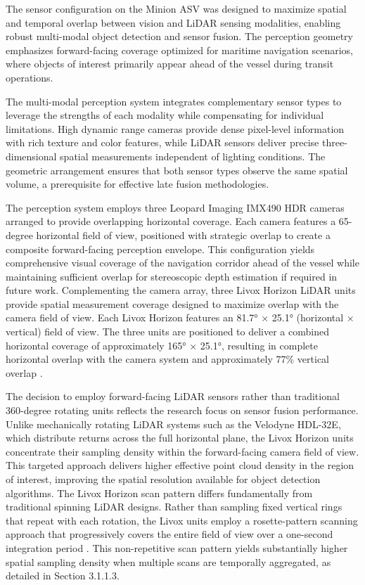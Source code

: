\documentclass{erauthesis}
\begin{document}
The sensor configuration on the Minion \ac{ASV} was designed to maximize spatial and temporal overlap between vision and \ac{LiDAR} sensing modalities, enabling robust multi-modal object detection and sensor fusion.
The perception geometry emphasizes forward-facing coverage optimized for maritime navigation scenarios, where objects of interest primarily appear ahead of the vessel during transit operations.

The multi-modal perception system integrates complementary sensor types to leverage the strengths of each modality while compensating for individual limitations.
High dynamic range cameras provide dense pixel-level information with rich texture and color features, while \ac{LiDAR} sensors deliver precise three-dimensional spatial measurements independent of lighting conditions.
The geometric arrangement ensures that both sensor types observe the same spatial volume, a prerequisite for effective late fusion methodologies.

The perception system employs three Leopard Imaging IMX490 \ac{HDR} cameras arranged to provide overlapping horizontal coverage.
Each camera features a 65-degree horizontal field of view, positioned with strategic overlap to create a composite forward-facing perception envelope.
This configuration yields comprehensive visual coverage of the navigation corridor ahead of the vessel while maintaining sufficient overlap for stereoscopic depth estimation if required in future work.
Complementing the camera array, three Livox Horizon \ac{LiDAR} units provide spatial measurement coverage designed to maximize overlap with the camera field of view.
Each Livox Horizon features an 81.7° × 25.1° (horizontal × vertical) field of view.
The three units are positioned to deliver a combined horizontal coverage of approximately 165° × 25.1°, resulting in complete horizontal overlap with the camera system and approximately 77\% vertical overlap \cite{thompson2023}.

The decision to employ forward-facing \ac{LiDAR} sensors rather than traditional 360-degree rotating units reflects the research focus on sensor fusion performance.
Unlike mechanically rotating \ac{LiDAR} systems such as the Velodyne HDL-32E, which distribute returns across the full horizontal plane, the Livox Horizon units concentrate their sampling density within the forward-facing camera field of view.
This targeted approach delivers higher effective point cloud density in the region of interest, improving the spatial resolution available for object detection algorithms.
The Livox Horizon scan pattern differs fundamentally from traditional spinning \ac{LiDAR} designs.
Rather than sampling fixed vertical rings that repeat with each rotation, the Livox units employ a rosette-pattern scanning approach that progressively covers the entire field of view over a one-second integration period \cite{thompson2023}.
This non-repetitive scan pattern yields substantially higher spatial sampling density when multiple scans are temporally aggregated, as detailed in Section 3.1.1.3.
\end{document}
